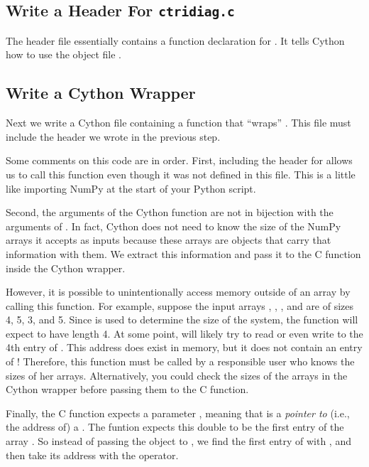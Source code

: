 \subsection*{Write a Header For \texttt{ctridiag.c}}

The header file essentially contains a function declaration for .
It tells Cython how to use the object file .


\subsection*{Write a Cython Wrapper}
Next we write a Cython file containing a function that ``wraps'' .
This file must include the header we wrote in the previous step.



Some comments on this code are in order. 
First, including the header for  allows us to call this function even though it was not defined in this file.
This is a little like importing NumPy at the start of your Python script.

Second, the arguments of the Cython function  are not in bijection with the arguments of .
In fact, Cython does not need to know the size of the NumPy arrays it accepts as inputs because these arrays are objects that carry that information with them.
We extract this information and pass it to the C function inside the Cython wrapper.

However, it is possible to unintentionally access memory outside of an array by calling this function.
For example, suppose the input arrays , , , and  are of sizes 4, 5, 3, and 5.
Since  is used to determine the size of the system, the function  will expect  to have length 4.
At some point,  will likely try to read or even write to the 4th entry of .
This address does exist in memory, but it does not contain an entry of !
Therefore, this function must be called by a responsible user who knows the sizes of her arrays.
Alternatively, you could check the sizes of the arrays in the Cython wrapper before passing them to the C function.

Finally, the C function expects a parameter , meaning that  is a \emph{pointer to} (i.e., the address of) a .
The funtion  expects this double to be the first entry of the array .
So instead of passing the object  to , we find the first entry of  with , and then take its address with the \li{&} operator.






